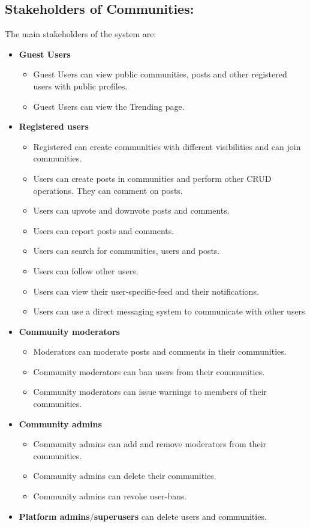 \documentclass[11pt]{article}
\begin{document}
\subsection{Stakeholders of Communities:}
The main stakeholders of the system are:
\begin{itemize}
    \item \textbf{Guest Users}
          \begin{itemize}
              \item Guest Users can view public communities, posts and other registered users with public profiles.
              \item Guest Users can view the Trending page.
          \end{itemize}
    \item \textbf{Registered users}
          \begin{itemize}
              \item Registered can create communities with different visibilities and can join communities.
              \item Users can create posts in communities and perform other CRUD operations. They can comment on posts.
              \item Users can upvote and downvote posts and comments.
              \item Users can report posts and comments.
              \item Users can search for communities, users and posts.
              \item Users can follow other users.
              \item Users can view their user-specific-feed and their notifications.
              \item Users can use a direct messaging system to communicate with other users
          \end{itemize}
    \item \textbf{Community moderators}
          \begin{itemize}
              \item Moderators can moderate posts and comments in their communities.
              \item Community moderators can ban users from their communities.
              \item Community moderators can issue warnings to members of their communities.
          \end{itemize}
    \item \textbf{Community admins} \begin{itemize}
              \item Community admins can add and remove moderators from their communities.
              \item Community admins can delete their communities.
              \item Community admins can revoke user-bans.
          \end{itemize}
    \item \textbf{Platform admins}/\textbf{superusers} can delete users and communities.
\end{itemize}
\end{document}
